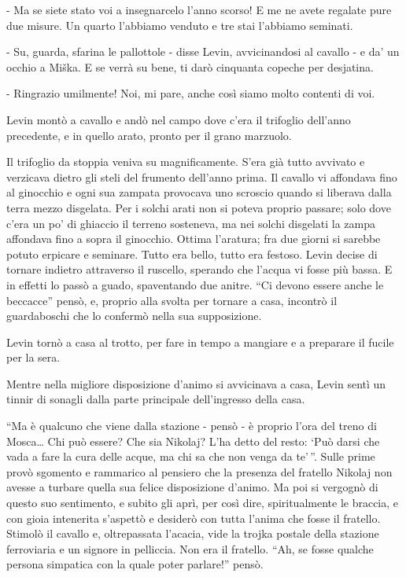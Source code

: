 - Ma se siete stato voi a insegnarcelo l'anno scorso! E me ne avete regalate pure due misure. Un quarto l'abbiamo venduto e tre stai l'abbiamo seminati. 

- Su, guarda, sfarina le pallottole - disse Levin, avvicinandosi al cavallo - e da' un occhio a Miška. E se verrà su bene, ti darò cinquanta copeche per desjatina. 

- Ringrazio umilmente! Noi, mi pare, anche così siamo molto contenti di voi. 

Levin montò a cavallo e andò nel campo dove c'era il trifoglio dell'anno precedente, e in quello arato, pronto per il grano marzuolo. 

Il trifoglio da stoppia veniva su magnificamente. S'era già tutto avvivato e verzicava dietro gli steli del frumento dell'anno prima. Il cavallo vi affondava fino al ginocchio e ogni sua zampata provocava uno scroscio quando si liberava dalla terra mezzo disgelata. Per i solchi arati non si poteva proprio passare; solo dove c'era un po' di ghiaccio il terreno sosteneva, ma nei solchi disgelati la zampa affondava fino a sopra il ginocchio. Ottima l'aratura; fra due giorni si sarebbe potuto erpicare e seminare. Tutto era bello, tutto era festoso. Levin decise di tornare indietro attraverso il ruscello, sperando che l'acqua vi fosse più bassa. E in effetti lo passò a guado, spaventando due anitre. ``Ci devono essere anche le beccacce'' pensò, e, proprio alla svolta per tornare a casa, incontrò il guardaboschi che lo confermò nella sua supposizione. 

Levin tornò a casa al trotto, per fare in tempo a mangiare e a preparare il fucile per la sera. 

Mentre nella migliore disposizione d'animo si avvicinava a casa, Levin sentì un tinnir di sonagli dalla parte principale dell'ingresso della casa. 

``Ma è qualcuno che viene dalla stazione - pensò - è proprio l'ora del treno di Mosca\ldots{} Chi può essere? Che sia Nikolaj? L'ha detto del resto: `Può darsi che vada a fare la cura delle acque, ma chi sa che non venga da te'\,''. Sulle prime provò sgomento e rammarico al pensiero che la presenza del fratello Nikolaj non avesse a turbare quella sua felice disposizione d'animo. Ma poi si vergognò di questo suo sentimento, e subito gli aprì, per così dire, spiritualmente le braccia, e con gioia intenerita s'aspettò e desiderò con tutta l'anima che fosse il fratello. Stimolò il cavallo e, oltrepassata l'acacia, vide la trojka postale della stazione ferroviaria e un signore in pelliccia. Non era il fratello. ``Ah, se fosse qualche persona simpatica con la quale poter parlare!'' pensò. 

